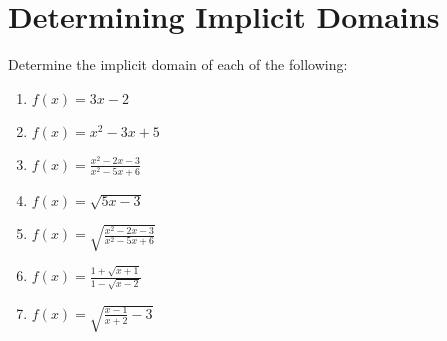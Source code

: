 \documentclass[letterpaper,12pt,fleqn]{article}
\begin{document}
\section*{Determining Implicit Domains}

\bigskip

Determine the implicit domain of each of the following:
\begin{enumerate}[left=0in]
\item \(f(x)=3x-2\)
\item \(f(x)=x^2-3x+5\)
\item \(\displaystyle f(x)=\frac{x^2-2x-3}{x^2-5x+6}\)
\item \(f(x)=\sqrt{5x-3}\)
\item \(\displaystyle f(x)=\sqrt{\frac{x^2-2x-3}{x^2-5x+6}}\)
\item \(\displaystyle f(x)=\frac{1+\sqrt{x+1}}{1-\sqrt{x-2}}\)
\item \(\displaystyle f(x)=\sqrt{\frac{x-1}{x+2}-3}\)
\end{enumerate}
\end{document}
